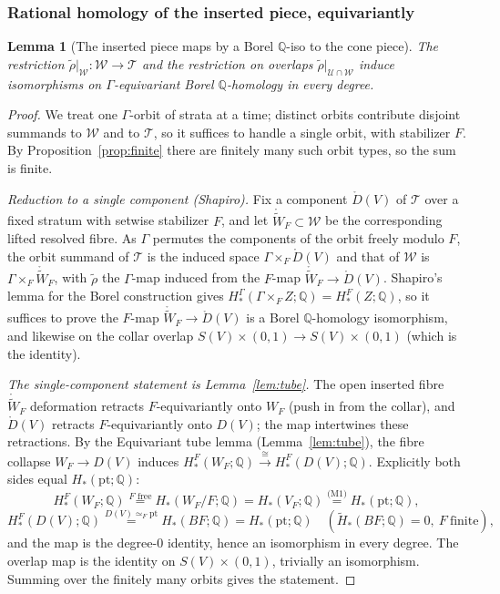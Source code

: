 \documentclass[12pt]{article}
\newtheorem{lemma}[theorem]{Lemma}
\theoremstyle{definition}
\begin{document}
\subsubsection*{Rational homology of the inserted piece, equivariantly}

\begin{lemma}[The inserted piece maps by a Borel $\mathbb{Q}$-iso to the cone
piece]\label{lem:insertMV}
The restriction $\widetilde\rho|_{\mathcal W}\colon\mathcal W\to\mathcal T$ and the
restriction on overlaps $\widetilde\rho|_{\mathcal U\cap\mathcal W}$ induce
isomorphisms on $\Gamma$-equivariant Borel $\mathbb{Q}$-homology in every degree.
\end{lemma}

\begin{proof}
We treat one $\Gamma$-orbit of strata at a time; distinct orbits contribute
disjoint summands to $\mathcal W$ and to $\mathcal T$, so it suffices to handle a
single orbit, with stabilizer $F$. By Proposition~\ref{prop:finite} there are
finitely many such orbit types, so the sum is finite.

\emph{Reduction to a single component (Shapiro).} Fix a component
$\mathring D(V)$ of $\mathcal T$ over a fixed stratum with setwise stabilizer $F$,
and let $\mathring{\widetilde W}_F\subset\mathcal W$ be the corresponding lifted
resolved fibre. As $\Gamma$ permutes the components of the orbit freely modulo
$F$, the orbit summand of $\mathcal T$ is the induced space
$\Gamma\times_F\mathring D(V)$ and that of $\mathcal W$ is
$\Gamma\times_F\mathring{\widetilde W}_F$, with $\widetilde\rho$ the $\Gamma$-map
induced from the $F$-map $\mathring{\widetilde W}_F\to\mathring D(V)$. Shapiro's
lemma for the Borel construction gives
$H^\Gamma_*(\Gamma\times_F Z;\mathbb{Q})=H^F_*(Z;\mathbb{Q})$, so it suffices to
prove the $F$-map $\mathring{\widetilde W}_F\to\mathring D(V)$ is a Borel
$\mathbb{Q}$-homology isomorphism, and likewise on the collar overlap
$S(V)\times(0,1)\to S(V)\times(0,1)$ (which is the identity).

\emph{The single-component statement is Lemma~\ref{lem:tube}.} The open inserted
fibre $\mathring{\widetilde W}_F$ deformation retracts $F$-equivariantly onto
$W_F$ (push in from the collar), and $\mathring D(V)$ retracts $F$-equivariantly
onto $D(V)$; the map intertwines these retractions. By the Equivariant tube lemma
(Lemma~\ref{lem:tube}), the fibre collapse $W_F\to D(V)$ induces
$H^F_*(W_F;\mathbb{Q})\xrightarrow{\cong}H^F_*(D(V);\mathbb{Q})$. Explicitly both
sides equal $H_*(\mathrm{pt};\mathbb{Q})$:
\[
   H^F_*(W_F;\mathbb{Q})\overset{F\text{ free}}{=}H_*(W_F/F;\mathbb{Q})
   =H_*(V_F;\mathbb{Q})\overset{\text{(M1)}}{=}H_*(\mathrm{pt};\mathbb{Q}),
\]
\[
   H^F_*(D(V);\mathbb{Q})\overset{D(V)\simeq_F\mathrm{pt}}{=}H_*(BF;\mathbb{Q})
   =H_*(\mathrm{pt};\mathbb{Q})\quad(\widetilde H_*(BF;\mathbb{Q})=0,\ F\ \text{finite}),
\]
and the map is the degree-$0$ identity, hence an isomorphism in every degree. The
overlap map is the identity on $S(V)\times(0,1)$, trivially an isomorphism.
Summing over the finitely many orbits gives the statement.
\end{proof}
\end{document}
